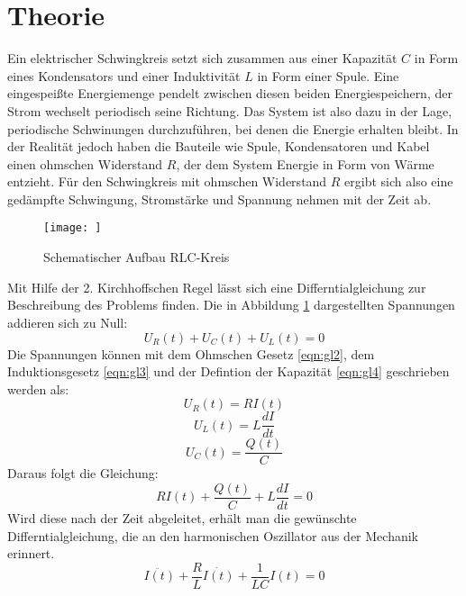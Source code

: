 \section{Theorie}
\label{sec:Theorie}

Ein elektrischer Schwingkreis setzt sich zusammen aus einer Kapazität $C$ in Form eines Kondensators und einer Induktivität $L$ in Form einer Spule.
Eine eingespeißte Energiemenge pendelt zwischen diesen beiden Energiespeichern, der Strom wechselt periodisch seine Richtung.
Das System ist also dazu in der Lage, periodische Schwinungen durchzuführen, bei denen die Energie erhalten bleibt.
In der Realität jedoch haben die Bauteile wie Spule, Kondensatoren und Kabel einen ohmschen Widerstand $R$, der dem System Energie in Form von Wärme entzieht.
Für den Schwingkreis mit ohmschen Widerstand $R$ ergibt sich also eine gedämpfte Schwingung, Stromstärke und Spannung nehmen mit der Zeit ab.
\begin{figure}
  \centering
  \texttt{[image: ]}
  \caption{Schematischer Aufbau RLC-Kreis}
  \label{fig:abb1}
\end{figure}
Mit Hilfe der 2. Kirchhoffschen Regel lässt sich eine Differntialgleichung zur Beschreibung des Problems finden.
Die in Abbildung \ref{fig:abb1} dargestellten Spannungen addieren sich zu Null:
\begin{equation}
  U_R(t) + U_C(t) + U_L(t)  = 0
  \label{eqn:gl1}
\end{equation}
Die Spannungen können mit dem Ohmschen Gesetz \eqref{eqn:gl2}, dem Induktionsgesetz \eqref{eqn:gl3} und der Defintion der Kapazität \eqref{eqn:gl4} geschrieben werden als:
\begin{equation}
  U_R(t) = RI(t)
  \label{eqn:gl2}
\end{equation}
\begin{equation}
  U_L(t) = L \frac{dI}{dt}
  \label{eqn:gl3}
\end{equation}
\begin{equation}
  U_C(t) = \frac{Q(t)}{C}
  \label{eqn:gl4}
\end{equation}
Daraus folgt die Gleichung:
\begin{equation}
  RI(t) + \frac{Q(t)}{C} + L \frac{dI}{dt} = 0
  \label{eqn:gl5}
\end{equation}
Wird diese nach der Zeit abgeleitet, erhält man die gewünschte Differntialgleichung, die an den harmonischen Oszillator aus der Mechanik erinnert.
\begin{equation}
  \ddot{I(t)} + \frac{R}{L} \dot{I(t)} + \frac{1}{LC}I(t) = 0
  \label{eqn:gl6}
\end{equation}
